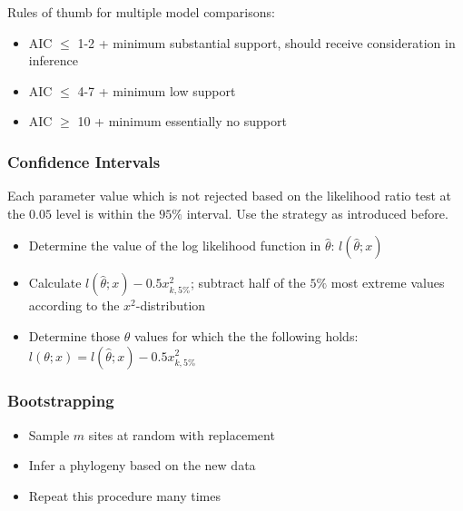 \documentclass{article}
\begin{document}
\begin{multicols*}{3}
Rules of thumb for multiple model comparisons: 
\begin{itemize}
    \item AIC $\leq$ 1-2 + minimum \textrightarrow substantial support, should receive consideration in inference
    \item AIC $\leq$ 4-7 + minimum \textrightarrow low support
    \item AIC $\geq$ 10 + minimum \textrightarrow essentially no support
\end{itemize}

\subsubsection{Confidence Intervals}

Each parameter value which is not rejected based on the likelihood ratio test at the $0.05$ level is within the $95\%$ interval.
\textrightarrow Use the strategy as introduced before.
\begin{itemize}
    \item Determine the value of the log likelihood function in $\hat{\theta}$: $l(\hat{\theta};x)$
    \item Calculate $l(\hat{\theta};x) - 0.5x^2_{k,5\%}$; subtract half of the $5\%$ most extreme values according to the $x^2$-distribution
    \item Determine those $\theta$ values for which the the following holds: 
    $l(\theta;x) = l(\hat{\theta};x) - 0.5x^2_{k,5\%}$
\end{itemize}

\subsubsection{Bootstrapping}
\begin{itemize}
    \item Sample $m$ sites at random with replacement
    \item Infer a phylogeny based on the new data
    \item Repeat this procedure many times 
\end{itemize}


\end{multicols*}
\end{document}

